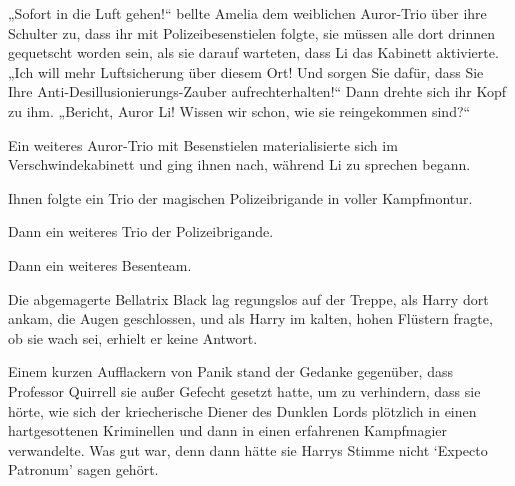 „Sofort in die Luft gehen!“ bellte Amelia dem weiblichen Auror-Trio über ihre Schulter zu, dass ihr mit Polizeibesenstielen folgte, sie müssen alle dort drinnen gequetscht worden sein, als sie darauf warteten, dass Li das Kabinett aktivierte. „Ich will mehr Luftsicherung über diesem Ort! Und sorgen Sie dafür, dass Sie Ihre Anti-Desillusionierungs-Zauber aufrechterhalten!“ Dann drehte sich ihr Kopf zu ihm. „Bericht, Auror Li! Wissen wir schon, wie sie reingekommen sind?“

Ein weiteres Auror-Trio mit Besenstielen materialisierte sich im Verschwindekabinett und ging ihnen nach, während Li zu sprechen begann.

Ihnen folgte ein Trio der magischen Polizeibrigande in voller Kampfmontur.

Dann ein weiteres Trio der Polizeibrigande.

Dann ein weiteres Besenteam.

\later

Die abgemagerte Bellatrix Black lag regungslos auf der Treppe, als Harry dort ankam, die Augen geschlossen, und als Harry im kalten, hohen Flüstern fragte, ob sie wach sei, erhielt er keine Antwort.

Einem kurzen Aufflackern von Panik stand der Gedanke gegenüber, dass Professor Quirrell sie außer Gefecht gesetzt hatte, um zu verhindern, dass sie hörte, wie sich der kriecherische Diener des Dunklen Lords plötzlich in einen hartgesottenen Kriminellen und dann in einen erfahrenen Kampfmagier verwandelte. Was gut war, denn dann hätte sie Harrys Stimme nicht `Expecto Patronum' sagen gehört.

